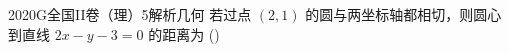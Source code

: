 
\begin{problem}{2020}{G}{全国II卷（理）}{5}{解析几何}
若过点 $ (2,1) $ 的圆与两坐标轴都相切，则圆心到直线 $ 2x - y - 3 = 0 $ 的距离为 (\hspace{1cm})
\begin{choices}
\end{choices}
\end{problem}

\begin{answer}

\end{answer}

\begin{solutions}

\end{solutions}